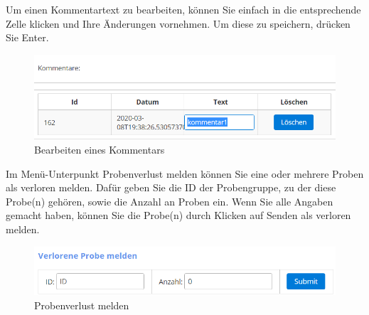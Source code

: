 \documentclass[enabledeprecatedfontcommands,fontsize=12pt,paper=a4,twoside]{scrartcl}
\begin{document}
Um einen Kommentartext zu bearbeiten, können Sie einfach in die entsprechende Zelle klicken und Ihre Änderungen vornehmen. Um diese zu speichern, drücken Sie Enter. \\

\begin{figure}[h!]
\begin{center}
 \includegraphics[width=\textwidth]{screenshots/t/probenkommentarbearbeiten.png}
  \caption{Bearbeiten eines Kommentars}
  \label{fig:boat1}
\end{center}
\end{figure}


Im Menü-Unterpunkt Probenverlust melden können Sie eine oder mehrere Proben als verloren melden. Dafür geben Sie die ID der Probengruppe, zu der diese Probe(n) gehören, sowie die Anzahl an Proben ein. Wenn Sie alle Angaben gemacht haben, können Sie die Probe(n) durch Klicken auf Senden als verloren melden. \\

\begin{figure}[h!]
\begin{center}
 \includegraphics[width=\textwidth]{screenshots/t/probemelden.png}
  \caption{Probenverlust melden}
  \label{fig:boat1}
\end{center}
\end{figure}
\end{document}
